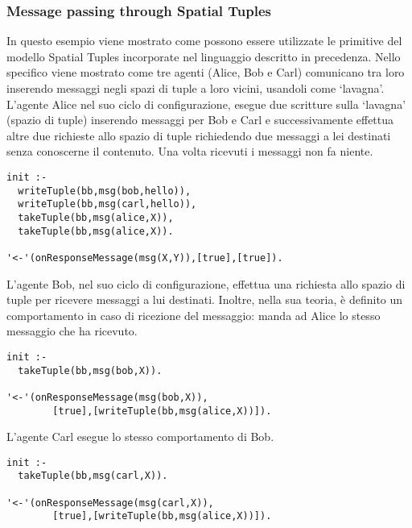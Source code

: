 \subsubsection{Message passing through Spatial Tuples}
In questo esempio viene mostrato come possono essere utilizzate le primitive del modello Spatial Tuples incorporate nel linguaggio descritto in precedenza. Nello specifico viene mostrato come tre agenti (Alice, Bob e Carl) comunicano tra loro inserendo messaggi negli spazi di tuple a loro vicini, usandoli come `lavagna'.
L'agente Alice nel suo ciclo di configurazione, esegue due scritture sulla `lavagna' (spazio di tuple) inserendo messaggi per Bob e Carl e successivamente effettua altre due richieste allo spazio di tuple richiedendo due messaggi a lei destinati senza conoscerne il contenuto. Una volta ricevuti i messaggi non fa niente.

\switchToProlog{}
\begin{lstlisting}[float,firstnumber=1,label={lst:Alice},caption={Alice}]
init :-
  writeTuple(bb,msg(bob,hello)),
  writeTuple(bb,msg(carl,hello)),
  takeTuple(bb,msg(alice,X)),
  takeTuple(bb,msg(alice,X)).

'<-'(onResponseMessage(msg(X,Y)),[true],[true]).
\end{lstlisting}

L'agente Bob, nel suo ciclo di configurazione, effettua una richiesta allo spazio di tuple per ricevere messaggi a lui destinati. Inoltre, nella sua teoria, è definito un comportamento in caso di ricezione del messaggio: manda ad Alice lo stesso messaggio che ha ricevuto.

\switchToProlog{}
\begin{lstlisting}[float,firstnumber=1,label={lst:Bob},caption={Bob}]
init :-
  takeTuple(bb,msg(bob,X)).

'<-'(onResponseMessage(msg(bob,X)),
		[true],[writeTuple(bb,msg(alice,X))]).
\end{lstlisting}

L'agente Carl esegue lo stesso comportamento di Bob.

\switchToProlog{}
\begin{lstlisting}[float,firstnumber=1,label={lst:Carl},caption={Carl}]
init :-
  takeTuple(bb,msg(carl,X)).

'<-'(onResponseMessage(msg(carl,X)),
		[true],[writeTuple(bb,msg(alice,X))]).
\end{lstlisting}
